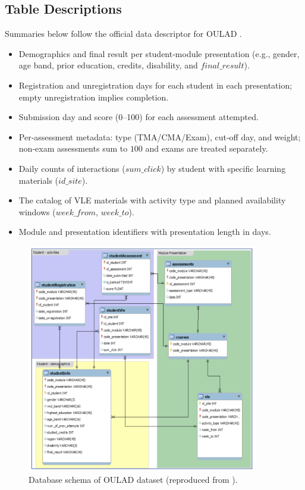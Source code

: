 \documentclass[ %
                    author={Carlos Duran Calle},
                supervisor={Dr. Felipe Campelo},
                    degree={MSc},
                     title={Comparative Machine Learning Analysis for Student Dropout Prediction in a Virtual Learning Environment},
                  subtitle={Incorporating Student Engagement and Socio-Economic Features},
                      type={},
                      year={2025}]{dissertation}
\begin{document}
\subsection{Table Descriptions}
Summaries below follow the official data descriptor for OULAD \cite{kuzilek_OULAD_2017}.
\begin{itemize}
	\item Demographics and final result per student‑module presentation (e.g., gender, age band, prior education, credits, disability, and $final\_result$).
	\item Registration and unregistration days for each student in each presentation; empty unregistration implies completion.
	\item Submission day and score (0–100) for each assessment attempted.
	\item Per‑assessment metadata: type (TMA/CMA/Exam), cut‑off day, and weight; non‑exam assessments sum to $100$ and exams are treated separately.
	\item Daily counts of interactions ($sum\_click$) by student with specific learning materials ($id\_site$).
	\item The catalog of VLE materials with activity type and planned availability windows ($week\_from$, $week\_to$).
	\item Module and presentation identifiers with presentation length in days.
\end{itemize}

\begin{figure}[h]
	\centering
	\includegraphics[width=0.9\textwidth]{../Visualizations/Report/2_1_database_scheme.png}
	\caption[Database schema of OULAD dataset]{Database schema of OULAD dataset (reproduced from \cite{nafea_enhancing_2023}).}
	\label{database_scheme}
\end{figure}
\end{document}
